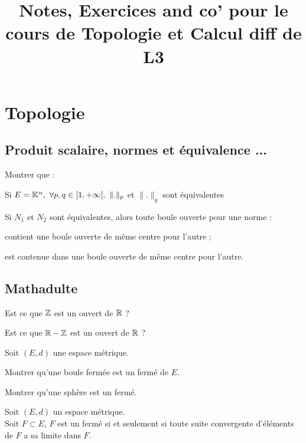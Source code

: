 

\title{Notes, Exercices and co' pour le cours de Topologie et Calcul diff de L3}


\maketitle

\section{Topologie}
\subsection{Produit scalaire, normes et équivalence ...}
\be 
Montrer que :
\ben
	\item Si $E = \mathbb{K}^n, ~ \forall p,q \in [1,+\infty [, ~ \|.\|_p$ et $\|.\|_q$ sont équivalentes
	\item Si $N_1$ et $N_2$ sont équivalentes, alors toute boule ouverte pour une norme : 
		\bi
			\item contient une boule ouverte de même centre pour l'autre ;
			\item est contenue dans une boule ouverte de même centre pour l'autre.
		\ei
\een
\ee

\subsection{Mathadulte}
\be
\ben
	\item Est ce que $\mathbb{Z}$ est un ouvert de $\mathbb{R}$ ?
	\item Est ce que $\mathbb{R}-\mathbb{Z}$ est un ouvert de $\mathbb{R}$ ?
\een
\ee

\be
\ben
Soit $(E,d)$ une espace métrique.
	\item Montrer qu'une boule fermée est un fermé de $E$.
	\item Montrer qu'une sphère est un fermé.
\een
\ee

\bp
Soit $(E,d)$ un espace métrique.\\
Soit $F \subset E$, $F$ est un fermé si et seulement si toute suite convergente d'éléments de $F$ a sa limite dans $F$.
\ep

